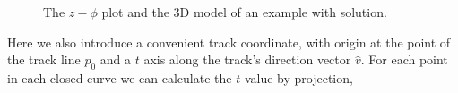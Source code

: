 \begin{figure}
	\centering
  \qquad
	\caption{The $z-\phi$ plot and the 3D model of an example with solution.}
	\label{fig:with_solution_cylinders}
\end{figure}
Here we also introduce a convenient track coordinate, with origin at the point of the track line $p_0$ and a $t$ axis along the track's direction vector $\hat{v}$. For each point in each closed curve we can calculate the $t$-value by projection,
